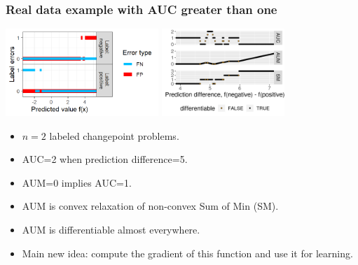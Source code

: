 \documentclass{beamer}
\begin{document}
\begin{frame}
  \frametitle{Real data example with AUC greater than one}

  \includegraphics[height=1.3in]{figure-aum-convexity-profiles}
  \includegraphics[height=1.3in]{figure-aum-convexity}

  \begin{itemize}
  \item $n=2$ labeled changepoint problems.
  \item AUC=2 when prediction difference=5.
  \item AUM=0 implies AUC=1.
  \item AUM is convex relaxation of non-convex Sum of Min (SM).
  \item AUM is differentiable almost everywhere.
  \item Main new idea: compute the gradient of this function and use
    it for learning.
  \end{itemize}

\end{frame}
\end{document}
